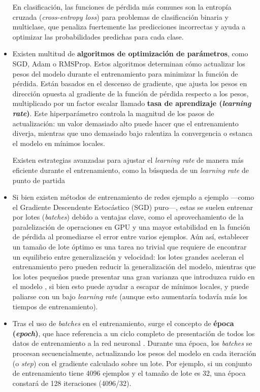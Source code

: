 \begin{itemize}
    En clasificación, las funciones de pérdida más comunes son la entropía cruzada (\textit{cross-entropy 
    loss}) para problemas de clasificación binaria y multiclase, que penaliza fuertemente las predicciones 
    incorrectas y ayuda a optimizar las probabilidades predichas para cada clase.


    \item Existen multitud de \textbf{algoritmos de optimización de parámetros}, como SGD, Adam o RMSProp. 
    Estos algoritmos determinan cómo actualizar los pesos del modelo durante el entrenamiento para minimizar 
    la función de pérdida. 
    Están basados en el descenso de gradiente, que ajusta los pesos en dirección opuesta al gradiente de 
    la función de pérdida respecto a los pesos, multiplicado por un factor escalar llamado \textbf{tasa 
    de aprendizaje (\textit{learning rate})}. Este hiperparámetro controla la magnitud de los pasos de 
    actualización: un valor demasiado alto puede hacer que el entrenamiento diverja, mientras que uno 
    demasiado bajo ralentiza la convergencia o estanca el modelo en mínimos locales.

    Existen estrategias avanzadas para ajustar el \textit{learning rate} de manera más eficiente durante el 
    entrenamiento, como la búsqueda de un \textit{learning rate} de punto de partida 


    \item Si bien existen métodos de entrenamiento de redes ejemplo a ejemplo ---como el Gradiente Descendente 
    Estocástico (SGD) puro\cite{bottou2010}---, estas se suelen entrenar por lotes (\textit{batches}) debido a     %
    ventajas clave, como el aprovechamiento de la paralelización de operaciones en GPU y una mayor estabilidad 
    en la función de pérdida al promediarse el error entre varios ejemplos. 
    Aún así, establecer un tamaño de lote óptimo es una tarea no trivial que requiere de encontrar un 
    equilibrio entre generalización y velocidad: los lotes grandes aceleran el entrenamiento pero pueden 
    reducir la generalización del modelo, mientras que los lotes pequeños puede presentar una gran varianza 
    que introduzca ruido en el modelo \cite{keskar2017}, si bien esto puede ayudar a escapar de mínimos 
    locales, y puede paliarse con un bajo \textit{learning rate} (aunque esto aumentaría todavía más los 
    tiempos de entrenamiento).
    

    \item Tras el uso de \textit{batches} en el entrenamiento, surge el concepto de \textbf{época 
    (\textit{epoch})}, que hace referencia a un ciclo completo de presentación de todos los datos de 
    entrenamiento a la red neuronal \cite{rusell2021}. Durante una época, los \textit{batches} se procesan 
    secuencialmente, actualizando los pesos del modelo en cada iteración (o \textit{step}) con el gradiente 
    calculado sobre un lote. Por ejemplo, si un conjunto de entrenamiento tiene 4096 ejemplos y el tamaño de 
    lote es 32, una época constará de 128 iteraciones (4096/32).


\end{itemize}
